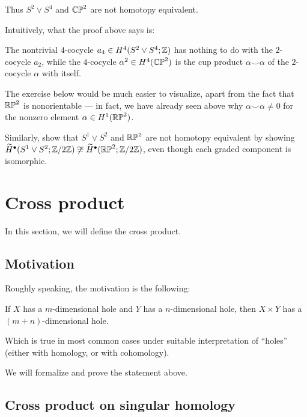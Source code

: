 Thus $S^2 \vee S^4$ and $\mathbb{CP}^2$ are not homotopy equivalent.

Intuitively, what the proof above says is:
\begin{moral}
	The nontrivial $4$-cocycle $a_4 \in H^4(S^2 \vee S^4; \mathbb Z)$
	has nothing to do with the $2$-cocycle $a_2$,
	while the $4$-cocycle $\alpha^2 \in H^4(\mathbb{CP}^2)$ is the cup product $\alpha
	\smile \alpha$ of the $2$-cocycle $\alpha$ with itself.
\end{moral}

The exercise below would be much easier to visualize, apart from the fact that $\mathbb{RP}^2$ is
nonorientable --- in fact, we have already seen
above why $\alpha \smile \alpha \neq 0$ for the nonzero element $\alpha \in H^1(\mathbb{RP}^2)$.

\begin{exercise}
	Similarly, show that $S^1 \vee S^2$ and $\mathbb{RP}^2$ are not homotopy equivalent by showing
	$\widetilde H^\bullet(S^1 \vee S^2; \mathbb Z/2\mathbb Z) \not\cong \widetilde H^\bullet(\mathbb{RP}^2; \mathbb Z/2\mathbb Z)$,
	even though each graded component is isomorphic.
\end{exercise}

\section{Cross product}

In this section, we will define the cross product.

\subsection{Motivation}

Roughly speaking, the motivation is the following:
\begin{moral}
	If $X$ has a $m$-dimensional hole and $Y$ has a $n$-dimensional hole, then $X \times Y$ has a
	$(m + n)$-dimensional hole.
\end{moral}
Which is true in most common cases under suitable interpretation of ``holes''
(either with homology, or with cohomology).

We will formalize and prove the statement above.

\subsection{Cross product on singular homology}

